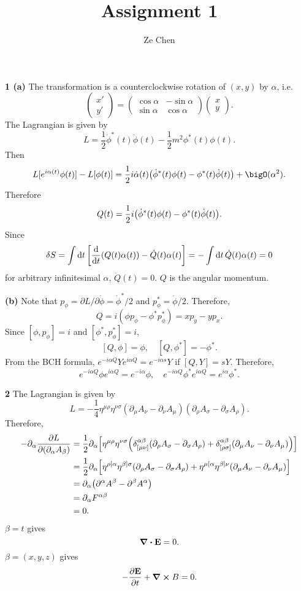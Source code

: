 \documentclass{article}
\title{Assignment 1}
\author{Ze Chen}
\makeatletter
\newcommand*{\shifttext}[1]{%
  \settowidth{\@tempdima}{#1}%
  \hspace{-\@tempdima}#1%
}
\newcommand{\plabel}[1]{%
\shifttext{\textbf{#1}\quad}%
}
\newcommand{\prule}{%
\begin{center}%
\hdashrule[0.5ex]{.99\linewidth}{1pt}{1pt 2.5pt}%
\end{center}%
}
\makeatother
\begin{document}
\maketitle

% 
% 

\plabel{1 (a)}%
The transformation is a counterclockwise rotation of $(x,y)$ by $\alpha$, i.e.
\[ \begin{pmatrix}
    x' \\ y'
\end{pmatrix} = \begin{pmatrix}
    \cos\alpha & -\sin\alpha \\ \sin\alpha & \cos\alpha
\end{pmatrix} \begin{pmatrix}
    x \\ y
\end{pmatrix}. \]
The Lagrangian is given by
\[ L = \frac{1}{2}\dot{\phi}^*(t)\dot{\phi}(t) - \frac{1}{2}m^2 \phi^*(t) \phi(t). \]
Then
\[ L[e^{i\alpha(t)}\phi(t)] - L[\phi(t)] = \frac{1}{2}i \dot{\alpha}(t)\qty(\dot{\phi}^*(t)\phi(t) - \phi^*(t)\dot{\phi}(t)) + \bigO(\alpha^2). \]
Therefore
\[ Q(t) = \frac{1}{2}i\qty(\dot{\phi}^*(t)\phi(t) - \phi^*(t)\dot{\phi}(t)). \]
Since
\[ \delta S = \int \dd{t} \qty[\dv{}{t}\qty(Q(t)\alpha(t)) - \dot{Q}(t)\alpha(t)] = - \int \dd{t} \dot{Q}(t)\alpha(t) = 0 \]
for arbitrary infinitesimal $\alpha$, $\dot{Q}(t) = 0$.
$Q$ is the angular momentum.

\plabel{(b)}%
Note that $p_\phi = \partial L / \partial \dot{\phi} = \dot{\phi}^*/2$ and $p_{\phi}^* = \dot{\phi}/2$.
Therefore,
\[ Q = i(\phi p_\phi - \phi^* p_\phi^*) = x p_y - y p_x. \]
Since $[\phi,p_\phi] = i$ and $[\phi^*, p^*_\phi] = i$,
\[ [Q,\phi] = \phi,\quad [Q,\phi^*] = -\phi^*. \]
From the BCH formula, $e^{-i\alpha Q} Y e^{i\alpha Q} = e^{-i\alpha s}Y$ if $[Q, Y] = sY$.
Therefore,
\[ e^{-i\alpha Q} \phi e^{i\alpha Q} = e^{-i\alpha} \phi,\quad e^{-i\alpha Q}\phi^* e^{i\alpha Q} = e^{i\alpha} \phi^*. \]

\prule

\plabel{2}%
The Lagrangian is given by
\[ L = -\frac{1}{4}\eta^{\mu\rho}\eta^{\nu\sigma}(\partial_\mu A_\nu - \partial_\nu A_\mu)(\partial_\rho A_\sigma - \partial_\sigma A_\rho). \]
Therefore,
\begin{align*}
    -\partial_\alpha \pdv{L}{(\partial_\alpha A_\beta)} &= \frac{1}{2} \partial_\alpha\qty[ \eta^{\mu\rho}\eta^{\nu\sigma} \qty(\delta^{\alpha\beta}_{[\mu\nu]}(\partial_\rho A_\sigma - \partial_\sigma A_\rho) + \delta^{\alpha\beta}_{[\rho\sigma]}(\partial_\mu A_\nu - \partial_\nu A_\mu)) ] \\
    &= \frac{1}{2} \partial_\alpha\qty[ \eta^{\rho[\alpha}\eta^{\beta]\sigma}(\partial_\rho A_\sigma - \partial_\sigma A_\rho) + \eta^{\mu[\alpha}\eta^{\beta]\nu}(\partial_\mu A_\nu - \partial_\nu A_\mu) ] \\
    &= \partial_\alpha\qty(\partial^\alpha A^\beta - \partial^\beta A^\alpha) \\
    &= \partial_\alpha F^{\alpha\beta} \\
    &= 0.
\end{align*}
$\beta = t$ gives
\[ \div \vb{E} = 0. \]
$\beta = (x,y,z)$ gives
\[ -\pdv{\vb{E}}{t} + \curl B = 0. \]
\end{document}
